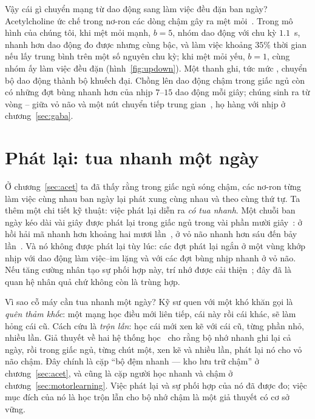 Vậy cái gì chuyển mạng từ dao động sang làm việc đều đặn ban ngày? Acetylcholine ức chế trong nơ-ron các dòng chậm gây ra mệt mỏi~\cite{McCormick1992}. Trong mô hình của chúng tôi, khi mệt mỏi mạnh, $b=5$, nhóm dao động với chu kỳ $1.1$~s, nhanh hơn dao động đo được nhưng cùng bậc, và làm việc khoảng $35\%$ thời gian nếu lấy trung bình trên một số nguyên chu kỳ; khi mệt mỏi yếu, $b=1$, cùng nhóm ấy làm việc đều đặn (hình~\ref{fig:updown}). Một thanh ghi, tức mức , chuyển bộ dao động thành bộ khuếch đại. Chồng lên dao động chậm trong giấc ngủ còn có những đợt bùng nhanh hơn của nhịp $7$--$15$ dao động mỗi giây; chúng sinh ra từ vòng -- giữa vỏ não và một nút chuyển tiếp trung gian~\cite{SteriadeMcCormickSejnowski1993}, họ hàng với nhịp ở chương~\ref{sec:gaba}.

\section{Phát lại: tua nhanh một ngày}

Ở chương~\ref{sec:acet} ta đã thấy rằng trong giấc ngủ sóng chậm, các nơ-ron từng làm việc cùng nhau ban ngày lại phát xung cùng nhau và theo cùng thứ tự. Ta thêm một chi tiết kỹ thuật: việc phát lại diễn ra \emph{có tua nhanh}. Một chuỗi ban ngày kéo dài vài giây được phát lại trong giấc ngủ trong vài phần mười giây~\cite{Nadasdy1999}: ở hồi hải mã nhanh hơn khoảng hai mươi lần~\cite{LeeWilson2002}, ở vỏ não nhanh hơn sáu đến bảy lần~\cite{Euston2007}. Và nó không được phát lại tùy lúc: các đợt phát lại ngắn ở một vùng khớp nhịp với dao động làm việc--im lặng và với các đợt bùng nhịp nhanh ở vỏ não. Nếu tăng cường nhân tạo sự phối hợp này, trí nhớ được cải thiện~\cite{Maingret2016}; đây đã là quan hệ nhân quả chứ không còn là trùng hợp.

Vì sao cỗ máy cần tua nhanh một ngày? Kỹ sư quen với một khó khăn gọi là \emph{quên thảm khốc}: một mạng học điều mới liên tiếp, cái này rồi cái khác, sẽ làm hỏng cái cũ. Cách cứu là \emph{trộn lẫn}: học cái mới xen kẽ với cái cũ, từng phần nhỏ, nhiều lần. Giả thuyết về hai hệ thống học~\cite{McClelland1995} cho rằng bộ nhớ nhanh ghi lại cả ngày, rồi trong giấc ngủ, từng chút một, xen kẽ và nhiều lần, phát lại nó cho vỏ não chậm. Đây chính là cặp ``bộ đệm nhanh --- kho lưu trữ chậm'' ở chương~\ref{sec:acet}, và cũng là cặp người học nhanh và chậm ở chương~\ref{sec:motorlearning}. Việc phát lại và sự phối hợp của nó đã được đo; việc mục đích của nó là học trộn lẫn cho bộ nhớ chậm là một giả thuyết có cơ sở vững.

